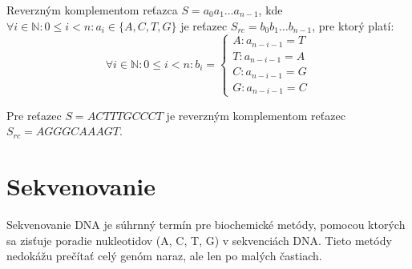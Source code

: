 %    

\begin{defn}
    \label{def:reverzny_komplement}
    Reverzným komplementom reťazca $S=a_0a_1 \ldots a_{n-1}$, kde \\
    $\forall i \in \mathbb{N} : 0 \leq i < n : a_i \in \{A, C, T, G\}$ je reťazec $S_{rc}=b_0b_1 \ldots b_{n-1}$, pre ktorý platí:
    $$
    \forall i \in \mathbb{N} : 0 \leq i < n : b_i = \begin{cases}
                                                        A : a_{n-i-1} = T \\
                                                        T : a_{n-i-1} = A \\
                                                        C : a_{n-i-1} = G \\
                                                        G : a_{n-i-1} = C  
                                                    \end{cases}
    $$
\end{defn}

\begin{example}
    Pre reťazec $S=ACTTTGCCCT$ je reverzným komplementom reťazec $S_{rc}=AGGGCAAAGT$.
\end{example}

\section{Sekvenovanie}
\label{sec:sekvenovanie}
Sekvenovanie DNA je súhrnný termín pre biochemické metódy, pomocou ktorých sa zisťuje poradie nukleotidov (A, C, T, G) v sekvenciách DNA. Tieto metódy nedokážu prečítať celý genóm naraz, ale len po malých častiach. 

